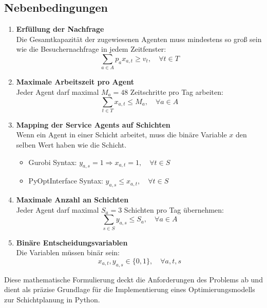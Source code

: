 \subsection*{Nebenbedingungen}
\begin{enumerate}
    \item \textbf{Erfüllung der Nachfrage}\\
          Die Gesamtkapazität der zugewiesenen Agenten muss mindestens so groß sein wie die Besuchernachfrage in jedem Zeitfenster:
          $$\sum_{a \in A} p_a x_{a,t} \geq v_t, \quad \forall t \in T$$
    \item \textbf{Maximale Arbeitszeit pro Agent}\\
          Jeder Agent darf maximal $M_a = 48$ Zeitschritte pro Tag arbeiten:
          $$\sum_{t \in T} x_{a,t} \leq M_a, \quad \forall a \in A$$
    \item \textbf{Mapping der Service Agents auf Schichten}\\
          Wenn ein Agent in einer Schicht arbeitet, muss die binäre Variable $x$ den selben Wert haben wie die Schicht.
          \begin{itemize}
              \item Gurobi Syntax: $ y_{a,s} = 1 \Rightarrow x_{a,t} = 1, \quad \forall t \in S $
              \item PyOptInterface Syntax: $ y_{a,s} \leq x_{a,t}, \quad \forall t \in S $
          \end{itemize}
    \item \textbf{Maximale Anzahl an Schichten}\\
          Jeder Agent darf maximal $S_a = 3$ Schichten pro Tag übernehmen:
          $$\sum_{s \in S} y_{a,s} \leq S_a,\quad\forall a\in A$$
    \item \textbf{Binäre Entscheidungsvariablen}\\
          Die Variablen müssen binär sein:
          $$x_{a,t}, y_{a,s} \in \{0,1\},\quad\forall a,t,s$$
\end{enumerate}

Diese mathematische Formulierung deckt die Anforderungen des Problems ab und dient als präzise Grundlage für die Implementierung eines Optimierungsmodells zur Schichtplanung in Python.
